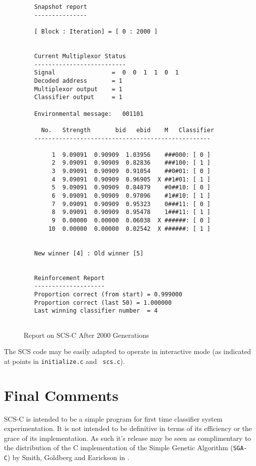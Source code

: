 \begin{figure}
\begin{center}
\begin{verbatim}
   Snapshot report
   ---------------
 
   [ Block : Iteration] = [ 0 : 2000 ]
 
 
   Current Multiplexor Status
   --------------------------
   Signal                =  0  0  1  1  0  1
   Decoded address       = 1
   Multiplexor output    = 1
   Classifier output     = 1
 
   Environmental message:   001101
 
     No.   Strength       bid   ebid    M   Classifier
   --------------------------------------------------
 
        1  9.09091  0.90909  1.03956    ###000: [ 0 ]
        2  9.09091  0.90909  0.82836    ###100: [ 1 ]
        3  9.09091  0.90909  0.91054    ##0#01: [ 0 ]
        4  9.09091  0.90909  0.96905  X ##1#01: [ 1 ]
        5  9.09091  0.90909  0.84879    #0##10: [ 0 ]
        6  9.09091  0.90909  0.97096    #1##10: [ 1 ]
        7  9.09091  0.90909  0.95323    0###11: [ 0 ]
        8  9.09091  0.90909  0.95478    1###11: [ 1 ]
        9  0.00000  0.00000  0.06038  X ######: [ 0 ]
       10  0.00000  0.00000  0.02542  X ######: [ 1 ]
 
 
   New winner [4] : Old winner [5]
 
 
   Reinforcement Report
   --------------------
   Proportion correct (from start) = 0.999000
   Proportion correct (last 50) = 1.000000
   Last winning classifier number  = 4


\end{verbatim}
\caption{Report on SCS-C After 2000 Generations}
\label{gens2000}
\end{center}
\end{figure}
 
 The SCS code may be easily adapted to operate in interactive
mode (as indicated at points in {\tt initialize.c} and {\tt
scs.c}).

\section{Final Comments}

  SCS-C is intended to be a simple program for first
time classifier system experimentation. It is not
intended to be definitive in terms of its efficiency
or the grace of its implementation. As such it's release may
be seen as complimentary to the distribution of the C
implementation of the Simple Genetic Algorithm ({\tt SGA-C})
by Smith, Goldberg and Earickson in \cite{3}. 

